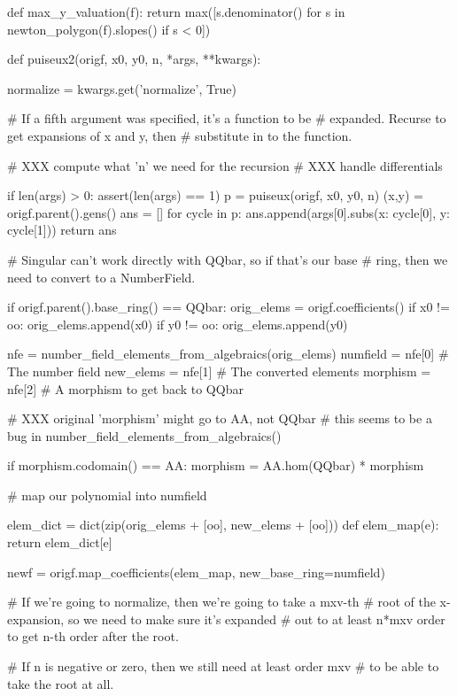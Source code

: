 \begin{sagecommonsmall}
def max_y_valuation(f):
    return max([s.denominator() for s in newton_polygon(f).slopes() if s < 0])

def puiseux2(origf, x0, y0, n, *args, **kwargs):

    normalize = kwargs.get('normalize', True)

    # If a fifth argument was specified, it's a function to be
    # expanded.  Recurse to get expansions of x and y, then
    # substitute in to the function.

    # XXX compute what 'n' we need for the recursion
    # XXX handle differentials

    if len(args) > 0:
        assert(len(args) == 1)
        p = puiseux(origf, x0, y0, n)
        (x,y) = origf.parent().gens()
        ans = []
        for cycle in p:
           ans.append(args[0].subs({x: cycle[0], y: cycle[1]}))
        return ans

    # Singular can't work directly with QQbar, so if that's our base
    # ring, then we need to convert to a NumberField.

    if origf.parent().base_ring() == QQbar:
        orig_elems = origf.coefficients()
        if x0 != oo: orig_elems.append(x0)
        if y0 != oo: orig_elems.append(y0)

        nfe = number_field_elements_from_algebraics(orig_elems)
        numfield = nfe[0]  # The number field
        new_elems = nfe[1] # The converted elements
        morphism = nfe[2]  # A morphism to get back to QQbar

        # XXX original 'morphism' might go to AA, not QQbar
        # this seems to be a bug in number_field_elements_from_algebraics()

        if morphism.codomain() == AA:
            morphism = AA.hom(QQbar) * morphism

        # map our polynomial into numfield

        elem_dict = dict(zip(orig_elems + [oo], new_elems + [oo]))
        def elem_map(e): return elem_dict[e]

        newf = origf.map_coefficients(elem_map, new_base_ring=numfield)

        # If we're going to normalize, then we're going to take a mxv-th
        # root of the x-expansion, so we need to make sure it's expanded
        # out to at least n*mxv order to get n-th order after the root.

        # If n is negative or zero, then we still need at least order mxv
        # to be able to take the root at all.


\end{sagecommonsmall}
